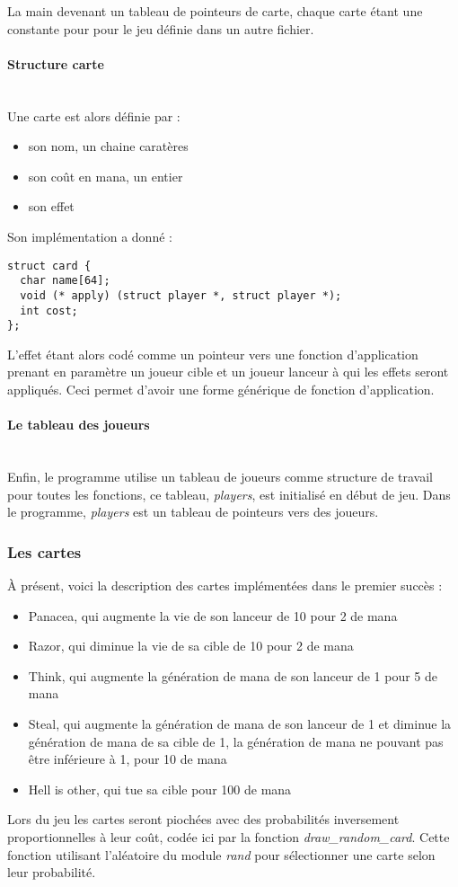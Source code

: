 \documentclass[12pt]{article}
\begin{document}
La main devenant un tableau de pointeurs de carte, chaque carte étant une constante pour pour le jeu définie dans un autre fichier.
\smallbreak %
\paragraph{Structure carte} ~\\
\smallbreak
Une carte est alors définie par :
\begin{itemize}
\item son nom, un chaine caratères
\item son coût en mana, un entier
\item son effet
\end{itemize}

Son implémentation a donné :
\begin{verbatim}
struct card {
  char name[64];
  void (* apply) (struct player *, struct player *);
  int cost;
};
\end{verbatim}

L'effet étant alors codé comme un pointeur vers une fonction d'application prenant en paramètre un joueur cible et un joueur lanceur à qui les effets seront appliqués.
Ceci permet d'avoir une forme générique de fonction d'application.
\smallbreak
\paragraph{Le tableau des joueurs} ~\\
\smallbreak
Enfin, le programme utilise un tableau de joueurs comme structure de travail pour toutes les fonctions, ce tableau, \textit{players}, est initialisé en début de jeu.
Dans le programme, \textit{players} est un tableau de pointeurs vers des joueurs.
\subsubsection{Les cartes}
À présent, voici la description des cartes implémentées dans le premier succès :
\begin{itemize}
\item Panacea, qui augmente la vie de son lanceur de 10 pour 2 de mana
\item Razor, qui diminue la vie de sa cible de 10 pour 2 de mana
\item Think, qui augmente la génération de mana de son lanceur de 1 pour 5 de mana
\item Steal, qui augmente la génération de mana de son lanceur de 1 et diminue la génération de mana de sa cible de 1, la génération de mana ne pouvant pas être inférieure à 1, pour 10 de mana
\item Hell is other, qui tue sa cible pour 100 de mana
\end{itemize}
Lors du jeu les cartes seront piochées avec des probabilités inversement proportionnelles à leur coût, codée ici par la fonction \textit{draw\_random\_card}.
Cette fonction utilisant l'aléatoire du module \textit{rand} pour sélectionner une carte selon leur probabilité.
\end{document}
